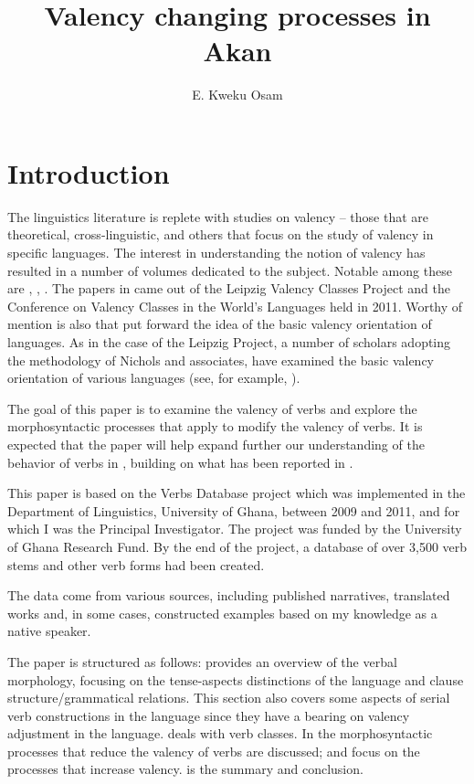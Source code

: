 \documentclass[output=paper]{langsci/langscibook}
\title{Valency changing processes in {Akan}}
\author{%
E. Kweku Osam\affiliation{University of Ghana} 
}
\begin{document}
\section{Introduction}\label{§1:introduction.osam}

The linguistics literature is replete with studies on valency -- those that are theoretical, cross-linguistic, and others that focus on the study of valency in specific languages. The interest in understanding the notion of valency has resulted in a number of volumes dedicated to the subject. Notable among these are \citet{comriepolinsky1993}, \citet{dixonaikhenvald2000a}, \citet{malchukovcomrieinpress}. The papers in \citet{malchukovcomrieinpress} came out of the Leipzig Valency Classes Project and the Conference on Valency Classes in the World's Languages held in 2011. Worthy of mention is also \citet{nicholsetal2004} that put forward the idea of the basic valency orientation of languages. As in the case of the Leipzig Project, a number of scholars adopting the methodology of Nichols and associates, have examined the basic valency orientation of various languages (see, for example, \citealt{narogg2009,planklahiri2009,vangelderen2011,luraghi2012}).  

The goal of this paper is to examine the valency of  verbs and explore the morphosyntactic processes that apply to modify the valency of verbs. It is expected that the paper will help expand further our understanding of the behavior of verbs in , building on what has been reported in \citet{osam2008a}. 

This paper is based on the  Verbs Database project which was implemented in the Department of Linguistics, University of Ghana, between 2009 and 2011, and for which I was the Principal Investigator. The project was funded by the University of Ghana Research Fund. By the end of the project, a database of over 3,500 verb stems and other verb forms had been created.

The data come from various sources, including published narratives, translated works and, in some cases, constructed examples based on my knowledge as a native speaker.

The paper is structured as follows:  provides an overview of the verbal morphology, focusing on the tense-aspects distinctions of the language and clause structure/grammatical relations. This section also covers some aspects of serial verb constructions in the language since they have a bearing on valency adjustment in the language.  deals with  verb classes. In  the morphosyntactic processes that reduce the valency of verbs are discussed;  and  focus on the processes that increase valency.  is the summary and conclusion.
\end{document}
